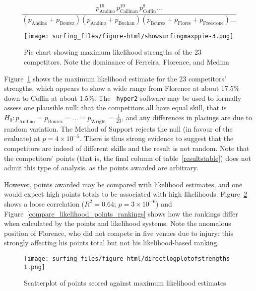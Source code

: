 \documentclass{article}
\begin{document}
\begin{equation}
\frac{
p_\mathrm{Andino}^{19}\, p_\mathrm{Callinan}^{19}\, p_\mathrm{Coffin}^{8}\ldots
}{
(p_\mathrm{Andino} + p_\mathrm{Bourez})  (p_\mathrm{Andino} + p_\mathrm{Buchan})(p_\mathrm{Bourez} + p_\mathrm{Flores} + p_\mathrm{Freestone})\ldots
}
\end{equation}

\begin{figure}
\texttt{[image: surfing\_files/figure-html/showsurfingmaxppie-3.png]} %
\caption{Pie chart\label{piechartmax} showing maximum likelihood strengths of the 23 competitors.  Note the
dominance of Ferreira, Florence, and Medina}
\end{figure}

Figure~\ref{piechartmax} shows the maximum likelihood estimate for the
23 competitors' strengths, which appears to show a wide range from
Florence at about 17.5\% down to Coffin at about 1.5\%.  The {\tt
hyper2} software may be used to formally assess one plausible null:
that the competitors all have equal skill, that is $H_0\colon
p_\mathrm{Andino} = p_\mathrm{Bourez}=\ldots=
p_\mathrm{Wright}=\frac{1}{23}$, and any differences in placings are
due to random variation.  The Method of Support \cite{edwards1973}
rejects the null (in favour of the evaluate) at $p=4\times 10^{-5}$.
There is thus strong evidence to suggest that the competitors are
indeed of different skills and the result is not random.  Note that
the competitors' points (that is, the final column of
table~\ref{resultstable}) does not admit this type of analysis, as the
points awarded are arbitrary.

However, points awarded may be compared with likelihood estimates, and
one would expect high points totals to be associated with high
likelihoods.  Figure~\ref{compare_likelihood_points} shows a loose
correlation ($R^2=0.64$; $p=3\times 10^{-6}$) and
Figure~\ref{compare_likelihood_points_rankings} shows how the rankings
differ when calculated by the points and likelihood systems.  Note the
anomalous position of Florence, who did not compete in five venues due
to injury: this strongly affecting his points total but not his
likelihood-based ranking.

\begin{figure}[h]
\texttt{[image: surfing\_files/figure-html/directlogplotofstrengths-1.png]}
\caption{Scatterplot of points scored  \label{compare_likelihood_points} 
against maximum likelihood estimates}
\end{figure}
\end{document}
